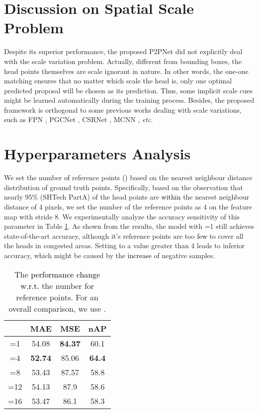 \documentclass[10pt,twocolumn,letterpaper]{article}
\newcommand{\ywu}[1]{\textcolor{black}{#1}}
\begin{document}
\section{Discussion on Spatial Scale Problem}\label{dis}
Despite its superior performance, the proposed P2PNet did not explicitly deal with the scale variation problem. Actually, different from bounding boxes, the head points themselves are scale ignorant in nature. In other words, the one-one matching ensures that no matter which scale the head is, only one optimal predicted proposal will be chosen as its prediction. Thus, some implicit scale cues might be learned automatically during the training process. Besides, the proposed framework is orthogonal to some previous works dealing with scale variations, such as FPN \cite{lin2017feature}, PGCNet \cite{pgc2019}, CSRNet \cite{li2018csrnet}, MCNN \cite{zhang2016single}, \textit{etc}.

\section{Hyperparameters Analysis}\label{ana}
We set the number \ywu{of} reference points \ywu{()} based on the nearest neighbour distance distribution of ground truth points. Specifically, based on the observation that nearly 95\% (SHTech PartA) of the head points are \ywu{within} the nearest neighbour distance of 4 pixels, we set the number of the reference points  as 4 on the feature map with stride 8. We experimentally analyze the accuracy sensitivity of this parameter in Table \ref{tab:num}. As shown from the results, the model with =1 still achieves state-of-the-art accuracy, although it's reference points are too \ywu{few} to cover all the heads in congested areas. Setting  to a value greater than 4 leads to inferior accuracy, which might be caused by the \ywu{increase} of negative samples.

\begin{table}[!ht]
\setlength\tabcolsep{18pt}
  \centering
  \begin{tabular}{c|c c c}
    \toprule[1pt]
     & MAE & MSE & nAP\\
    \hline
    =1 &  54.08  &  \textbf{84.37} & 60.1 \\
    =4 &  \textbf{52.74}  &  85.06 & \textbf{64.4} \\
    =8 &   53.43 &  87.57 &  58.8\\
    =12 &   54.13 &  87.9 & 58.6 \\
    =16 &  53.47  & 86.1  & 58.3  \\
    \bottomrule[1pt]
  \end{tabular}
  \caption{The \ywu{performance change w.r.t.} the number  for reference points. For an overall comparison, we use .}\label{tab:num}
\end{table}
\end{document}
